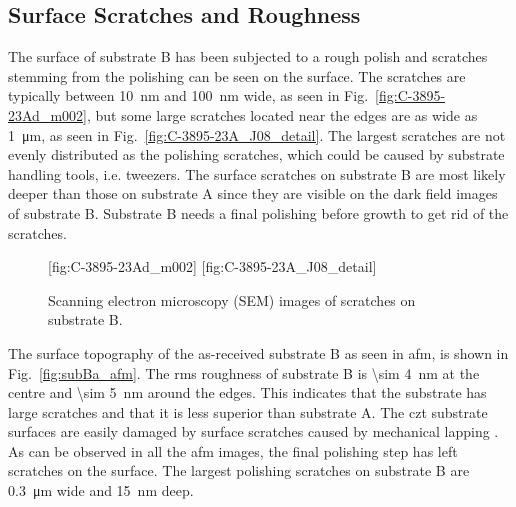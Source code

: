 
\subsection{Surface Scratches and Roughness}
The surface of substrate B has been subjected to a rough polish and scratches stemming from the polishing can be seen on the surface. The scratches are typically between \SI{10}{\nano\metre} and \SI{100}{\nano\metre} wide, as seen in Fig.~\ref{fig:C-3895-23Ad_m002}, but some large scratches located near the edges are as wide as \SI{1}{\micro\metre}, as seen in Fig.~\ref{fig:C-3895-23A_J08_detail}. The largest scratches are not evenly distributed as the polishing scratches, which could be caused by substrate handling tools, i.e. tweezers. The surface scratches on substrate B are most likely deeper than those on substrate A since they are visible on the dark field images of substrate B. Substrate B needs a final polishing before growth to get rid of the scratches.
\begin{figure}[htbp]
    \centering
    [fig:C-3895-23Ad_m002]
    [fig:C-3895-23A_J08_detail]
    \caption[SEM images of scratches on substrate B.]{Scanning electron microscopy (SEM) images of scratches on substrate B.}
    \label{fig:SEM_C389523_scratches}
\end{figure}

The surface topography of the as-received substrate B as seen in \ac{afm}, is shown in Fig.~\ref{fig:subBa_afm}. The \ac{rms} roughness of substrate B is \SI{\sim 4}{\nano\metre} at the centre and \SI{\sim 5}{\nano\metre} around the edges. This indicates that the substrate has large scratches and that it is less superior than substrate A. The \ac{czt} substrate surfaces are easily damaged by surface scratches caused by mechanical lapping \citep{egan2009scanning}. As can be observed in all the \ac{afm} images, the final polishing step has left scratches on the surface. The largest polishing scratches on substrate B are \SI{0.3}{\micro\metre} wide and \SI{15}{\nano\metre} deep.

